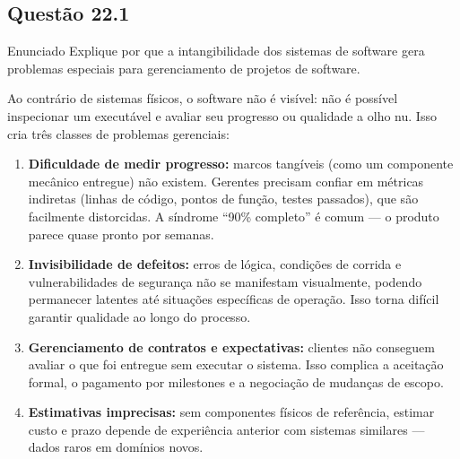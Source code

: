\documentclass[12pt,a4paper]{article}
\begin{document}
\subsection*{Questão 22.1}
\begin{questao}{Enunciado}
Explique por que a intangibilidade dos sistemas de software gera problemas
especiais para gerenciamento de projetos de software.
\end{questao}
\begin{resposta}
Ao contrário de sistemas físicos, o software não é visível: não é possível
inspecionar um executável e avaliar seu progresso ou qualidade a olho nu.
Isso cria três classes de problemas gerenciais:

\begin{enumerate}[nosep]
  \item \textbf{Dificuldade de medir progresso:} marcos tangíveis (como um
        componente mecânico entregue) não existem. Gerentes precisam confiar
        em métricas indiretas (linhas de código, pontos de função, testes
        passados), que são facilmente distorcidas. A síndrome ``90\%
        completo'' é comum — o produto parece quase pronto por semanas.

  \item \textbf{Invisibilidade de defeitos:} erros de lógica, condições de
        corrida e vulnerabilidades de segurança não se manifestam visualmente,
        podendo permanecer latentes até situações específicas de operação.
        Isso torna difícil garantir qualidade ao longo do processo.

  \item \textbf{Gerenciamento de contratos e expectativas:} clientes não
        conseguem avaliar o que foi entregue sem executar o sistema. Isso
        complica a aceitação formal, o pagamento por milestones e a
        negociação de mudanças de escopo.

  \item \textbf{Estimativas imprecisas:} sem componentes físicos de referência,
        estimar custo e prazo depende de experiência anterior com sistemas
        similares — dados raros em domínios novos.
\end{enumerate}
\end{resposta}

\end{document}
